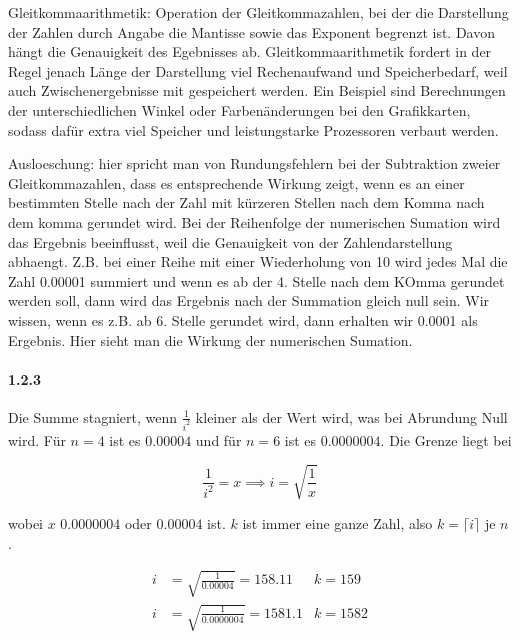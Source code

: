 \documentclass[a4paper,ngerman]{scrartcl}
\begin{document}
Gleitkommaarithmetik: Operation der Gleitkommazahlen, bei der die Darstellung der Zahlen durch Angabe die Mantisse sowie das Exponent begrenzt ist. Davon hängt die Genauigkeit des Egebnisses ab. Gleitkommaarithmetik fordert in der Regel jenach Länge der Darstellung viel Rechenaufwand und Speicherbedarf, weil auch Zwischenergebnisse mit gespeichert werden. Ein Beispiel sind Berechnungen der unterschiedlichen Winkel oder Farbenänderungen bei den Grafikkarten, sodass dafür extra viel Speicher und leistungstarke Prozessoren verbaut werden.

Ausloeschung: hier spricht man von Rundungsfehlern bei der Subtraktion zweier Gleitkommazahlen, dass es entsprechende Wirkung zeigt, wenn es an einer bestimmten Stelle nach der Zahl mit kürzeren Stellen nach dem Komma  nach dem komma gerundet wird.
Bei der Reihenfolge der numerischen Sumation wird das Ergebnis beeinflusst, weil die Genauigkeit von der Zahlendarstellung abhaengt. Z.B. bei einer Reihe mit einer Wiederholung von 10 wird jedes Mal die Zahl 0.00001 summiert und wenn es ab der 4. Stelle nach dem KOmma gerundet werden soll, dann wird das Ergebnis nach der Summation gleich null sein. Wir wissen, wenn es z.B. ab 6. Stelle gerundet wird, dann erhalten wir 0.0001 als Ergebnis. Hier sieht man die Wirkung der numerischen Sumation.

\paragraph{1.2.3}

Die Summe stagniert, wenn $\frac{1}{i^2}$ kleiner als der Wert wird, was bei Abrundung Null wird. Für $n = 4$ ist es $0.00004$ und für $n=6$ ist es $0.0000004$. Die Grenze liegt bei

\[
\frac{1}{i^2} = x \implies i = \sqrt{\frac{1}{x}}
\]

wobei $x$ $0.0000004$ oder $0.00004$ ist. $k$ ist immer eine ganze Zahl, also $k = \lceil i \rceil$ je $n$.

\begin{align*}
  i &= \sqrt{\frac{1}{0.00004}} = 158.11 & k = 159\\
  i &= \sqrt{\frac{1}{0.0000004}} = 1581.1 & k = 1582\\  
\end{align*}
\end{document}
